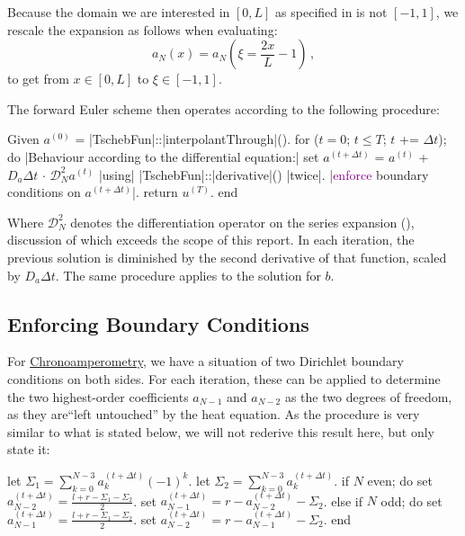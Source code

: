 \documentclass{prettytex/ox/mmsc-special-topic}
\begin{document}
  Because the domain we are interested in $[0, L]$ as specified in  is not $[-1, 1]$, we rescale the expansion as follows when evaluating:
  $$a_N(x) = a_N\left(\xi = \frac{2 x}{L} - 1\right)\,,$$
  to get from $x \in [0, L]$ to $\xi \in [-1, 1]$.

  The forward Euler scheme then operates according to the following procedure:
  \begin{algorithm}[language=pseudo, caption={\centering A Spectral Method in the Chebyshev Basis}, basicstyle=\footnotesize]
Given $a^{(0)}$ = |\color{themecolor3}TschebFun|::|\color{themecolor2}interpolantThrough|().
for ($t = 0$; $t \le T$; $t$ += $\Delta t$); do
  |\rm\color{gray}Behaviour according to the differential equation:|
  set $a^{(t+\Delta t)}$ = $a^{(t)}$ + $D_a \Delta t$ $\cdot$ $\mathcal{D}_N^2 a^{(t)}$ |\rm\color{gray}using| |\color{themecolor3}TschebFun|::|\color{themecolor2}derivative|() |\rm\color{gray}twice|.
  |\rm \textcolor{purple}{enforce} boundary conditions on $a^{(t+\Delta t)}$|.
  return $u^{(T)}$.
end
  \end{algorithm}
  Where $\mathcal{D}_N^2$ denotes the differentiation operator on the series expansion (), discussion of which exceeds the scope of this report.
  In each iteration, the previous solution is diminished by the second derivative of that function, scaled by $D_a \Delta t$.
  The same procedure applies to the solution for $b$.

  \subsection{Enforcing Boundary Conditions}
  For \underline{Chronoamperometry}, we have a situation of two Dirichlet boundary conditions on both sides. For each iteration, these can be applied to determine the two highest-order coefficients $a_{N-1}$ and $a_{N-2}$ as the two degrees of freedom, as they are``left untouched'' by the heat equation.
  As the procedure is very similar to what is stated below, we will not rederive this result here, but only state it:
  \begin{algorithm}[language=pseudo, caption={\centering Enforcing Dirichlet Boundary Conditions on both sides}, basicstyle=\footnotesize]
let $\Sigma_1 = \sum_{k=0}^{N-3} a_k^{(t+\Delta t)} (-1)^k$.
let $\Sigma_2 = \sum_{k=0}^{N-3} a_k^{(t+\Delta t)}$.
if $N$ even; do
  set $a_{N-2}^{(t+\Delta t)} = \frac{l+r-\Sigma_1-\Sigma_2}{2}$.
  set $a_{N-1}^{(t+\Delta t)} = r - a_{N-2}^{(t+\Delta t)} - \Sigma_2$.
else if $N$ odd; do
  set $a_{N-1}^{(t+\Delta t)} = \frac{l+r-\Sigma_1-\Sigma_2}{2}$.
  set $a_{N-2}^{(t+\Delta t)} = r - a_{N-1}^{(t+\Delta t)} - \Sigma_2$.
end
  \end{algorithm}
\end{document}
